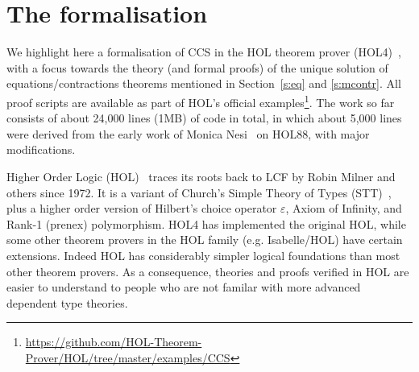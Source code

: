 
\newcommand\fun{{\to}}
\newcommand\prd{{\times}}
\newcommand{\ty}[1]{\textsl{#1}}
\newcommand\conj{\ \wedge\ }
\newcommand\disj{\ \vee\ }
\newcommand\imp{ \Rightarrow }
\newcommand\eqv{\ \equiv\ }
\newcommand\vbar{\mid}
\newcommand\turn{\ \vdash\ } %
\newcommand\hilbert{\varepsilon}
\newcommand{\uquant}[1]{\forall #1.\ }
\newcommand{\equant}[1]{\exists #1.\ }
\newcommand{\hquant}[1]{\hilbert #1.\ }
\newcommand{\iquant}[1]{\exists ! #1.\ }
\newcommand{\lquant}[1]{\lambda #1.\ }
\newcommand{\ml}[1]{\mbox{{\def\_{\char'137}\texttt{#1}}}}
\newcommand{\con}[1]{\mathrm{#1}}

\newcommand\bool{\ty{bool}}
\newcommand\num{\ty{num}}
\newcommand\ind{\ty{ind}}
\newcommand\lst{\ty{list}}

\providecommand{\T}{\con{T}}
\renewcommand{\T}{\con{T}}
\newcommand\F{\con{F}}
\newcommand\OneOne{\con{One\_One}}
\newcommand\OntoSubset{\con{Onto\_Subset}}
\newcommand\Onto{\con{Onto}}
\newcommand\TyDef{\con{Type\_Definition}}

\section{The formalisation}
\label{s:for}

We highlight here a formalisation of CCS in the HOL theorem prover
(HOL4)~\cite{Melham:1993vl,slind2008brief}, with a focus towards the
theory (and formal proofs) of the unique solution of
equations/contractions theorems mentioned in Section~\ref{s:eq} and
\ref{s:mcontr}.
All proof scripts are available as part of HOL's official
examples\footnote{\url{https://github.com/HOL-Theorem-Prover/HOL/tree/master/examples/CCS}}.
The work so far consists of about 24,000 lines (1MB) of code in total,
in which about 5,000 lines were derived from the early work of Monica
Nesi~\cite{Nesi:1992ve} on HOL88, with major modifications.

Higher Order Logic (HOL)~\cite{hollogic} traces
its roots back to LCF
\cite{gordon1979edinburgh,milner1972logic} by Robin Milner and others
since 1972. It is a variant of
Church’s Simple Theory of Types (STT)~\cite{church1940formulation},
plus a higher order version of Hilbert's choice operator $\varepsilon$,
Axiom of Infinity, and Rank-1 (prenex) polymorphism.
HOL4 has implemented the original HOL, 
while some other theorem provers in the HOL family (e.g. Isabelle/HOL) have
certain extensions.
Indeed HOL has considerably simpler logical
foundations than most other theorem provers. %
As a consequence, theories and proofs verified in HOL are easier to understand
 to people who are not familar with more advanced
dependent type theories.

